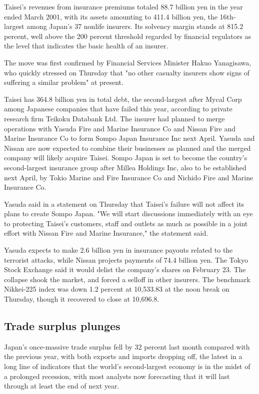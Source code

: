 \documentclass[]{article}
\begin{document}
Taisei's revenues from insurance premiums totaled 88.7 billion yen in the year ended March 2001, with its assets amounting to 411.4 billion yen, the 16th-largest among Japan's 37 nonlife insurers. Its solvency margin stands at 815.2 percent, well above the 200 percent threshold regarded by financial regulators as the level that indicates the basic health of an insurer.
 
The move was first confirmed by Financial Services Minister Hakuo Yanagisawa, who quickly stressed on Thursday that "no other casualty insurers show signs of suffering a similar problem" at present.
 
Taisei has 364.8 billion yen in total debt, the second-largest after Mycal Corp among Japanese companies that have failed this year, according to private research firm Teikoku Databank Ltd.
The insurer had planned to merge operations with Yasuda Fire and Marine Insurance Co and Nissan Fire and Marine Insurance Co to form Sompo Japan Insurance Inc next April. Yasuda and Nissan are now expected to combine their businesses as planned and the merged company will likely acquire Taisei. Sompo Japan is set to become the country's second-largest insurance group after Millea Holdings Inc, also to be established next April, by Tokio Marine and Fire Insurance Co and Nichido Fire and Marine Insurance Co.
 
Yasuda said in a statement on Thursday that Taisei's failure will not affect its plans to create Sompo Japan. "We will start discussions immediately with an eye to protecting Taisei's customers, staff and outlets as much as possible in a joint effort with Nissan Fire and Marine Insurance," the statement said.
 
Yasuda expects to make 2.6 billion yen in insurance payouts related to the terrorist attacks, while Nissan projects payments of 74.4 billion yen.
The Tokyo Stock Exchange said it would delist the company's shares on February 23. The collapse shook the market, and forced a selloff in other insurers. The benchmark Nikkei-225 index was down 1.2 percent at 10,533.83 at the noon break on Thursday, though it recovered to close at 10,696.8.
 
\subsection*{Trade surplus plunges}

Japan's once-massive trade surplus fell by 32 percent last month compared with the previous year, with both exports and imports dropping off, the latest in a long line of indicators that the world's second-largest economy is in the midst of a prolonged recession, with most analysts now forecasting that it will last through at least the end of next year.
 
\end{document}
